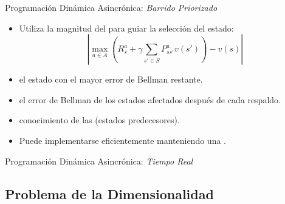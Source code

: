 \documentclass[10pt, envcountsect, handout, aspectratio=1610, hyperref={hypertexnames=true}]{beamer}
\begin{document}
\begin{frame}{Programación Dinámica Asincrónica: \textit{Barrido Priorizado}}
	{\cite{moore1993prioritized}}
	\begin{itemize} \large
		\item Utiliza la magnitud del  para guiar la selección del estado:
		\[
		\left|\max_{a \in A} \left(R^a_s + \gamma \sum_{s' \in S} P^a_{ss'} v(s')\right) - v(s)\right|
		\]
		\item {} el estado con el mayor error de Bellman restante.
		\item {} el error de Bellman de los estados afectados después de cada respaldo.
		\item {} conocimiento de las  (estados predecesores).
		\item Puede implementarse eficientemente manteniendo una .
	\end{itemize}
\end{frame}

\begin{frame}{Programación Dinámica Asincrónica: \textit{Tiempo Real}}
\end{frame}







%

\subsection{Problema de la Dimensionalidad}
\end{document}
